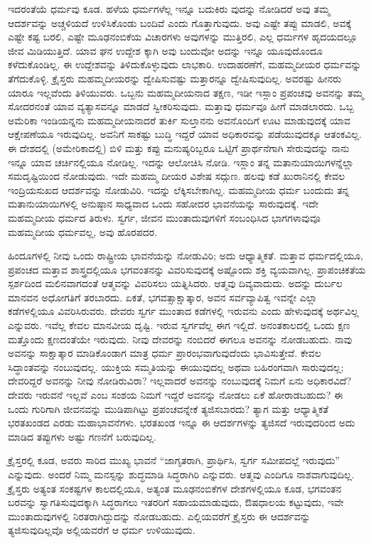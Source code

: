 ಇದರಂತೆಯೆ ಧರ್ಮವು ಕೂಡ. ಹಳೆಯ ಧರ್ಮಗಳೆಲ್ಲ ಇನ್ನೂ ಬದುಕಿರು ವುದನ್ನು ನೋಡಿದರೆ ಅವು ತಮ್ಮ ಆದರ್ಶವನ್ನು ಅಚ್ಚಳಿಯದೆ ಉಳಿಸಿಕೊಂಡು ಬಂದಿವೆ ಎಂದು ಗೊತ್ತಾಗುವುದು. ಅವು ಎಷ್ಟೇ ತಪ್ಪು ಮಾಡಲಿ, ಅವಕ್ಕೆ ಎಷ್ಟೇ ಕಷ್ಟ ಬರಲಿ, ಎಷ್ಟೇ ಮೂಢನಂಬಿಕೆಯ ವಿಚಾರಗಳು ಅವುಗಳನ್ನು ಮುತ್ತಿರಲಿ, ಎಲ್ಲ ಧರ್ಮಗಳ ಹೃದಯದಲ್ಲೂ ಜೀವ ಮಿಡಿಯುತ್ತಿದೆ. ಯಾವ ಘನ ಉದ್ದೇಶ ಕ್ಕಾಗಿ ಅವು ಬಂದುವೋ ಅದನ್ನು ಇನ್ನೂ ಯೂವುದೊಂದೂ ಕಳೆದುಕೊಂಡಿಲ್ಲ. ಈ ಉದ್ದೇಶವನ್ನು ತಿಳಿದುಕೊಳ್ಳುವುದು ಲಾಭಕಾರಿ. ಉದಾಹರಣೆಗೆ, ಮಹಮ್ಮದೀಯರ ಧರ್ಮವನ್ನು ತೆಗೆದುಕೊಳ್ಳಿ. ಕ್ರೈಸ್ತರು ಮಹಮ್ಮದೀಯರನ್ನು ದ್ವೇಷಿಸುವಷ್ಟು ಮತ್ತಾರನ್ನೂ ದ್ವೇಷಿಸುವುದಿಲ್ಲ. ಅವರಷ್ಟು ಹೀನರು ಯಾರೂ ಇಲ್ಲವೆಂದು ತಿಳಿಯುವರು. ಒಬ್ಬನು ಮಹಮ್ಮದೀಯನಾದ ತಕ್ಷಣ, ಇಡೀ ಇಸ್ಲಾಂ ಪ್ರಪಂಚವು ಅವನನ್ನು ತಮ್ಮ ಸೋದರನಂತೆ ಯಾವ ವ್ಯತ್ಯಾಸವನ್ನೂ ಮಾಡದೆ ಸ್ವೀಕರಿಸುವುದು. ಮತ್ತಾವು ಧರ್ಮವೂ ಹೀಗೆ ಮಾಡಲಾರದು. ಒಬ್ಬ ಅಮೆರಿಕಾ ಇಂಡಿಯನ್ನನು ಮಹಮ್ಮದೀಯನಾದರೆ ತುರ್ಕಿ ಸುಲ್ತಾನನು ಅವನೊಂದಿಗೆ ಊಟ ಮಾಡುವುದಕ್ಕೆ ಯಾವ ಆಕ್ಷೇಪಣೆಯೂ ಇರುವುದಿಲ್ಲ. ಅವನಿಗೆ ಸಾಕಷ್ಟು ಬುದ್ಧಿ ಇದ್ದರೆ ಯಾವ ಅಧಿಕಾರವನ್ನು ಪಡೆಯುವುದಕ್ಕೂ ಆತಂಕವಿಲ್ಲ. ಈ ದೇಶದಲ್ಲಿ (ಅಮೇರಿಕಾದಲ್ಲಿ) ಬಿಳಿ ಮತ್ತು ಕಪ್ಪು ಮನುಷ್ಯರಿಬ್ಬರೂ ಒಟ್ಟಿಗೆ ಪ್ರಾರ್ಥನೆಗಾಗಿ ಸೇರುವುದನ್ನು ನಾನು ಇನ್ನೂ ಯಾವ ಚರ್ಚಿನಲ್ಲಿಯೂ ನೋಡಿಲ್ಲ. ಇದನ್ನು ಆಲೋಚಿಸಿ ನೋಡಿ. ಇಸ್ಲಾಂ ತನ್ನ ಮತಾನುಯಾಯಿಗಳನ್ನೆಲ್ಲಾ ಸಮದೃಷ್ಟಿಯಿಂದ ನೋಡುವುದು. ಇದೇ ಮಹಮ್ಮ ದೀಯರ ವಿಶೇಷ ಸದ್ಗುಣ. ಹಲವು ಕಡೆ ಖುರಾನಿನಲ್ಲಿ ಕೇವಲ ಇಂದ್ರಿಯಸುಖದ ಆದರ್ಶವನ್ನು ನೋಡುವಿರಿ. ಇದನ್ನು ಲೆಕ್ಕಿಸಬೇಕಾಗಿಲ್ಲ. ಮಹಮ್ಮದೀಯ ಧರ್ಮ ಬಂದುದು ತನ್ನ ಮತಾನುಯಾಯಿಗಳಲ್ಲಿ ಅನುಷ್ಠಾನ ಸಾಧ್ಯವಾದ ಒಂದು ಸಹೋದರ ಭಾವನೆಯನ್ನು ಸಾರುವುದಕ್ಕೆ. ಇದೇ ಮಹಮ್ಮದೀಯ ಧರ್ಮದ ತಿರುಳು. ಸ್ವರ್ಗ, ಜೀವನ ಮುಂತಾದುವುಗಳಿಗೆ ಸಂಬಂಧಿಸಿದ ಭಾಗಗಳಾವುವೂ ಮಹಮ್ಮದೀಯ ಧರ್ಮವಲ್ಲ, ಅವು ಹೊರಪದರ.

ಹಿಂದೂಗಳಲ್ಲಿ ನೀವು ಒಂದು ರಾಷ್ಟ್ರೀಯ ಭಾವನೆಯನ್ನು ನೋಡುವಿರಿ; ಅದು ಆಧ್ಯಾತ್ಮಿಕತೆ. ಮತ್ತಾವ ಧರ್ಮದಲ್ಲಿಯೂ, ಪ್ರಪಂಚದ ಮತ್ತಾವ ಶಾಸ್ತ್ರದಲ್ಲಿಯೂ ಭಗವಂತನನ್ನು ವಿವರಿಸುವುದಕ್ಕೆ ಅಷ್ಟೊಂದು ಶಕ್ತಿ ವ್ಯಯವಾಗಿಲ್ಲ. ಪ್ರಾಪಂಚಿಕತೆಯ ಸ್ಪರ್ಶದಿಂದ ಮಲಿನವಾಗದಂತೆ ಆತ್ಮವನ್ನು ವಿವರಿಸಲು ಯತ್ನಿಸಿದರು. ಆತ್ಮವು ದಿವ್ಯವಾದುದು. ಅದನ್ನು ದುರ್ಬಲ ಮಾನವನ ಅಧೋಗತಿಗೆ ತರಬಾರದು. ಏಕತೆ, ಭಗವತ್ಸಾಕ್ಷಾತ್ಕಾರ, ಅವನ ಸರ್ವವ್ಯಾಪಿತ್ವ ಇವನ್ನೇ ಎಲ್ಲಾ ಕಡೆಗಳಲ್ಲಿಯೂ ವಿವರಿಸಿರುವರು. ದೇವರು ಸ್ವರ್ಗ ಮುಂತಾದ ಕಡೆಗಳಲ್ಲಿ ಇರುವನು ಎಂದು ಹೇಳುವುದಕ್ಕೆ ಅರ್ಥವಿಲ್ಲ ಎನ್ನುವರು. ಇವೆಲ್ಲ ಕೇವಲ ಮಾನವೀಯ ದೃಷ್ಟಿ. ಇರುವ ಸ್ವರ್ಗವೆಲ್ಲ ಈಗ ಇಲ್ಲಿದೆ. ಅನಂತಕಾಲದಲ್ಲಿ ಒಂದು ಕ್ಷಣ ಮತ್ತೊಂದು ಕ್ಷಣದಂತೆಯೇ ಇರುವುದು. ನೀವು ದೇವರನ್ನು ನಂಬಿದರೆ ಈಗಲೂ ಅವನನ್ನು ನೋಡಬಹುದು. ನಾವು ಅವನನ್ನು ಸಾಕ್ಷಾತ್ಕಾರ ಮಾಡಿಕೊಂಡಾಗ ಮಾತ್ರ ಧರ್ಮ ಪ್ರಾರಂಭವಾಗುವುದೆಂದು ಭಾವಿಸುತ್ತೇವೆ. ಕೇವಲ ಸಿದ್ಧಾಂತವನ್ನು ನಂಬುವುದಲ್ಲ. ಯುಕ್ತಿಯ ಸಮ್ಮತಿಯನ್ನು ಈಯುವುದಲ್ಲ ಅಥವಾ ಬಹಿರಂಗವಾಗಿ ಸಾರುವುದಲ್ಲ; ದೇವರಿದ್ದರೆ ಅವನನ್ನು ನೀವು ನೋಡಿರುವಿರಾ? ಇಲ್ಲವಾದರೆ ಅವನನ್ನು ನಂಬುವುದಕ್ಕೆ ನಿಮಗೆ ಏನು ಅಧಿಕಾರವಿದೆ? ದೇವರು ಇರುವನೆ ಇಲ್ಲವೆ ಎಂಬ ಸಂಶಯ ನಿಮಗೆ ಇದ್ದರೆ ಅವನನ್ನು ನೋಡಲು ಏಕೆ ಹೋರಾಡಬಹುದು? ಈ ಒಂದು ಗುರಿಗಾಗಿ ಜೀವನವನ್ನು ಮುಡಿಪಾಗಿಟ್ಟು ಪ್ರಪಂಚವನ್ನೇಕೆ ತ್ಯಜಿಸಬಾರದು? ತ್ಯಾಗ ಮತ್ತು ಆಧ್ಯಾತ್ಮಿಕತೆ ಭರತಖಂಡದ ಎರಡು ಮಹಾಭಾವನೆಗಳು. ಭರತಖಂಡ ಇನ್ನೂ ಈ ಆದರ್ಶಗಳನ್ನು ತ್ಯಜಿಸದೆ ಇರುವುದರಿಂದ ಅದು ಮಾಡಿದ ತಪ್ಪುಗಳು ಅಷ್ಟು ಗಣನೆಗೆ ಬರುವುದಿಲ್ಲ.

ಕ್ರೈಸ್ತರಲ್ಲಿ ಕೂಡ, ಅವರು ಸಾರಿದ ಮುಖ್ಯ ಭಾವನೆ “ಜಾಗೃತರಾಗಿ, ಪ್ರಾರ್ಥಿಸಿ, ಸ್ವರ್ಗ ಸಮೀಪದಲ್ಲೆ ಇರುವುದು” ಎನ್ನುವುದು. ಅಂದರೆ ನಿಮ್ಮ ಮನಸ್ಸನ್ನು ಶುದ್ಧಮಾಡಿ ಸಿದ್ಧರಾಗಿರಿ ಎನ್ನುವರು. ಆತ್ಮವು ಎಂದಿಗೂ ನಾಶವಾಗುವುದಿಲ್ಲ. ಕ್ರೈಸ್ತರು ಅತ್ಯಂತ ಸಂಕಷ್ಟಗಳ ಕಾಲದಲ್ಲಿಯೂ, ಅತ್ಯಂತ ಮೂಢನಂಬಿಕೆಗಳ ದೇಶಗಳಲ್ಲಿಯೂ ಕೂಡ, ಭಗವಂತನ ಬರವನ್ನು ಸ್ವಾಗತಿಸುವುದಕ್ಕಾಗಿ ಸಿದ್ಧರಾಗಲು ಇತರರಿಗೆ ಸಹಾಯಮಾಡುವುದು, ಔಷಧಾಲಯ ಕಟ್ಟುವುದು, ಇವೇ ಮುಂತಾದುವುಗಳಲ್ಲಿ ನಿರತರಾಗಿದ್ದುದನ್ನು ನೋಡಬಹುದು. ಎಲ್ಲಿಯವರೆಗೆ ಕ್ರೈಸ್ತರು ಈ ಆದರ್ಶವನ್ನು ತ್ಯಜಿಸುವುದಿಲ್ಲವೊ ಅಲ್ಲಿಯವರೆಗೆ ಆ ಧರ್ಮ ಉಳಿಯುವುದು.

